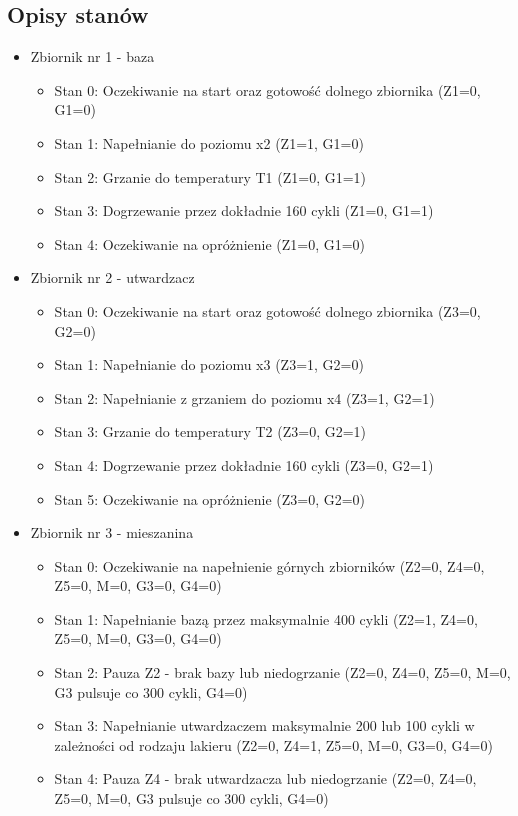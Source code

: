 \documentclass[12pt,oneside]{article}
\begin{document}
\subsection{Opisy stanów}
\begin{itemize}
    \item Zbiornik nr 1 - baza
    \begin{itemize}
        \item Stan 0: Oczekiwanie na start oraz gotowość dolnego zbiornika (Z1=0, G1=0)
        \item Stan 1: Napełnianie do poziomu x2 (Z1=1, G1=0)
        \item Stan 2: Grzanie do temperatury T1 (Z1=0, G1=1)
        \item Stan 3: Dogrzewanie przez dokładnie 160 cykli (Z1=0, G1=1)
        \item Stan 4: Oczekiwanie na opróżnienie (Z1=0, G1=0)
    \end{itemize}
    \item Zbiornik nr 2 - utwardzacz
    \begin{itemize}
        \item Stan 0: Oczekiwanie na start oraz gotowość dolnego zbiornika (Z3=0, G2=0)
        \item Stan 1: Napełnianie do poziomu x3 (Z3=1, G2=0)
        \item Stan 2: Napełnianie z grzaniem do poziomu x4 (Z3=1, G2=1)
        \item Stan 3: Grzanie do temperatury T2 (Z3=0, G2=1)
        \item Stan 4: Dogrzewanie przez dokładnie 160 cykli (Z3=0, G2=1)
        \item Stan 5: Oczekiwanie na opróżnienie (Z3=0, G2=0)
    \end{itemize}
    \item Zbiornik nr 3 - mieszanina
    \begin{itemize}
        \item Stan 0: Oczekiwanie na napełnienie górnych zbiorników (Z2=0, Z4=0, Z5=0, M=0, G3=0, G4=0)
        \item Stan 1: Napełnianie bazą przez maksymalnie 400 cykli (Z2=1, Z4=0, Z5=0, M=0, G3=0, G4=0)
        \item Stan 2: Pauza Z2 - brak bazy lub niedogrzanie (Z2=0, Z4=0, Z5=0, M=0, G3 pulsuje co 300 cykli, G4=0)
        \item Stan 3: Napełnianie utwardzaczem maksymalnie 200 lub 100 cykli w zależności od rodzaju lakieru (Z2=0, Z4=1, Z5=0, M=0, G3=0, G4=0)
        \item Stan 4: Pauza Z4 - brak utwardzacza lub niedogrzanie (Z2=0, Z4=0, Z5=0, M=0, G3 pulsuje co 300 cykli, G4=0)

\end{itemize}
\end{itemize}
\end{document}
